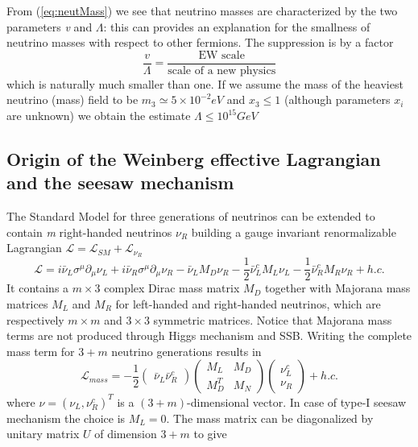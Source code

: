 \documentclass{subnucbo}
\begin{document}
From (\ref{eq:neutMass}) we see that neutrino masses are characterized by the two parameters \emph{v} and $\Lambda$: this can  provides an explanation for the smallness of neutrino masses with respect to other fermions. The suppression is by a factor
\begin{equation}
\frac{v}{\Lambda}=\frac{\text{EW scale}}{\text{scale of a new physics}}
\end{equation}
which is naturally much smaller than one.
If we assume the mass of the heaviest neutrino (mass) field to be $m_3\simeq5\times10^{-2}eV$ and $x_3\leq1$ (although parameters $x_i$ are unknown) we obtain the estimate $\Lambda\leq10^{15}GeV$

\subsection{Origin of the Weinberg effective Lagrangian and the seesaw mechanism}
The Standard Model for three generations of neutrinos can be extended to contain \emph{m} right-handed neutrinos $\nu_R$ building a gauge invariant renormalizable Lagrangian $\mathcal{L}=\mathcal{L}_{SM}+\mathcal{L}_{\nu_R}$ 
\begin{equation}
\label{eq:renormLag}
\mathcal{L}=i\bar{\nu}_L\sigma^{\mu}\partial_{\mu}\nu_L+i\bar{\nu}_R\sigma^{\mu}\partial_{\mu}\nu_R-\bar{\nu}_LM_D\nu_R-\frac{1}{2}\bar{\nu}^c_LM_L\nu_L-\frac{1}{2}\bar{\nu}_R^cM_R\nu_R+h.c.
\end{equation}
It contains a $m\times3$ complex Dirac mass matrix $M_D$ together with Majorana mass matrices $M_L$ and $M_R$ for left-handed and right-handed neutrinos, which are respectively $m\times m$ and $3\times3$ symmetric matrices. 
Notice that Majorana mass terms are not produced through Higgs mechanism and SSB.
Writing the complete mass term for $3+m$ neutrino generations results in 
\begin{equation}
\mathcal{L}_{mass}=-\frac{1}{2}\begin{pmatrix}\bar{\nu}_L \bar{\nu}_R^c\end{pmatrix}\begin{pmatrix}M_L & M_D\\ M_D^T & M_N\end{pmatrix}\begin{pmatrix}\nu_L^c\\ \nu_R\end{pmatrix}+h.c.
\end{equation}
where $\nu=(\nu_L, \nu_R^c)^T$ is a $(3+m)$-dimensional vector. In case of type-I seesaw mechanism the choice is $M_L=0$. The mass matrix can be diagonalized by unitary matrix $U$ of dimension $3+m$ to give 
\end{document}
